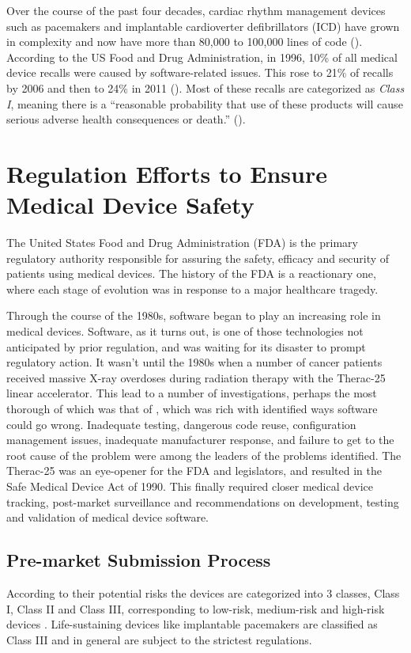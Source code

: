  Over the course of the past four decades, cardiac rhythm management devices such as pacemakers and implantable cardioverter defibrillators (ICD) have grown in complexity and now have more than 80,000 to 100,000 lines of code (\cite{pauljones}). According to the US Food and Drug Administration, in 1996, 10\% of all medical device recalls were caused by software-related issues. This rose to 21\% of recalls by 2006 and then to 24\% in 2011 (\cite{medstats}). Most of these recalls are categorized as \emph{Class I}, meaning there is a ``reasonable probability that use of these products will cause serious adverse health consequences or death.'' (\cite{medstats2,pacemakerrecalls,killedbycode}). 
	
\section{Regulation Efforts to Ensure Medical Device Safety}
The United States Food and Drug Administration (FDA) is the primary regulatory authority responsible for assuring the safety, efficacy and security of patients using medical devices. The history of the FDA is a reactionary one, where each stage of evolution was in response to a major healthcare tragedy. 

Through the course of the 1980s, software began to play an increasing role in medical devices. Software, as it turns out, is one of those technologies not anticipated by prior regulation, and was waiting for its disaster to prompt regulatory action. It wasn't until the 1980s when a number of cancer patients received massive X-ray overdoses during radiation therapy with the Therac-25 linear accelerator. This lead to a number of investigations, perhaps the most thorough of which was that of \cite{therac}, which was rich with identified ways software could go wrong. Inadequate testing, dangerous code reuse, configuration management issues, inadequate manufacturer response, and failure to get to the root cause of the problem were among the leaders of the problems identified. The Therac-25 was an eye-opener for the FDA and legislators, and resulted in the Safe Medical Device Act of 1990. This finally required closer medical device tracking, post-market surveillance and recommendations on development, testing and validation of medical device software. 

\subsection{Pre-market Submission Process}
According to their potential risks the devices are categorized into 3 classes, Class I, Class II and Class III, corresponding to low-risk, medium-risk and high-risk devices \cite{class}. Life-sustaining devices like implantable pacemakers are classified as Class III and in general are subject to the strictest regulations.

